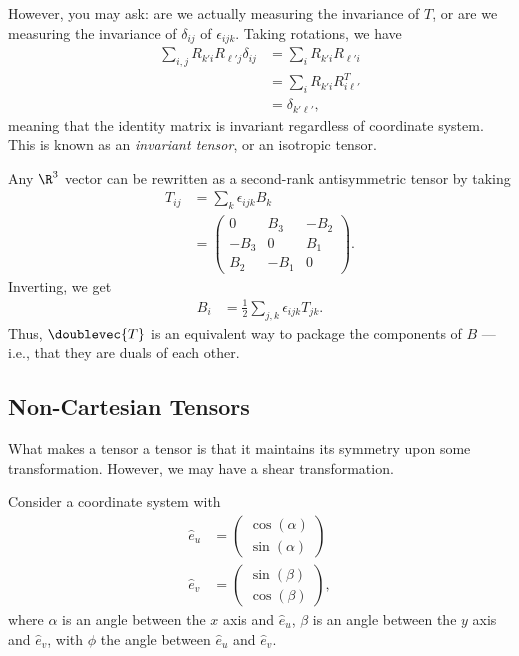 \documentclass[10pt]{mypackage}
\begin{document}
  However, you may ask: are we actually measuring the invariance of $T$, or are we measuring the invariance of $\delta_{ij}$ of $\epsilon_{ijk}$. Taking rotations, we have
  \begin{align*}
    \sum_{i,j} R_{k' i}R_{\ell' j}\delta_{ij} &= \sum_{i}R_{k'i}R_{\ell' i}\\
                                              &= \sum_{i}R_{k' i}R_{i \ell'}^{T}\\
                                              &= \delta_{k' \ell'},
  \end{align*}
  meaning that the identity matrix is invariant regardless of coordinate system. This is known as an \textit{invariant tensor}, or an isotropic tensor.
  \begin{example}
    Any $\R^3$ vector can be rewritten as a second-rank antisymmetric tensor by taking
    \begin{align*}
      T_{ij} &= \sum_{k}\epsilon_{ijk}B_k\\
             &= \begin{pmatrix}0 & B_3 & -B_2 \\ -B_3 & 0 & B_1\\B_2 & -B_1 & 0\end{pmatrix}.
    \end{align*}
    Inverting, we get
    \begin{align*}
      B_i &= \frac{1}{2}\sum_{j,k}\epsilon_{ijk}T_{jk}.
    \end{align*}
    Thus, $\doublevec{T}$ is an equivalent way to package the components of $B$ --- i.e., that they are duals of each other.
  \end{example}
  \subsection{Non-Cartesian Tensors}%
  What makes a tensor a tensor is that it maintains its symmetry upon some transformation. However, we may have a shear transformation.\newline

  Consider a coordinate system with
  \begin{align*}
    \hat{e}_u &= \begin{pmatrix}\cos\left( \alpha \right)\\\sin\left( \alpha \right)\end{pmatrix}\\
    \hat{e}_v &= \begin{pmatrix}\sin\left( \beta \right)\\\cos\left( \beta \right)\end{pmatrix},
  \end{align*}
  where $\alpha$ is an angle between the $x$ axis and $\hat{e}_u$, $\beta$ is an angle between the $y$ axis and $\hat{e}_v$, with $\phi$ the angle between $\hat{e}_u$ and $\hat{e}_v$.\newline
\end{document}
